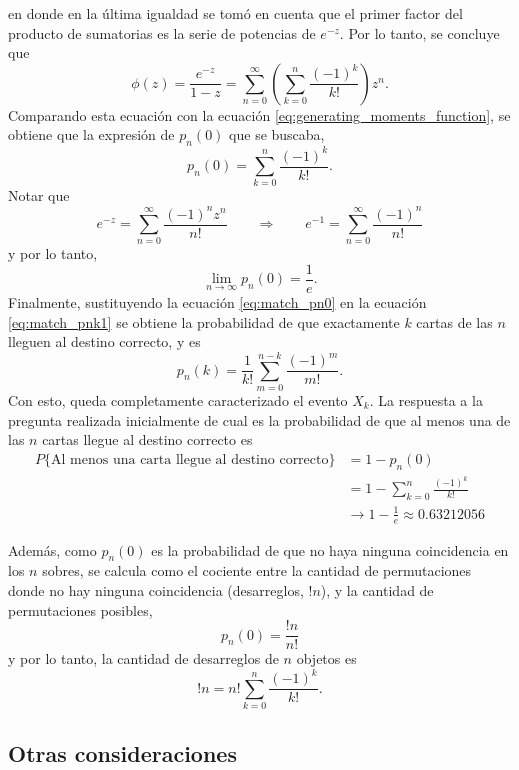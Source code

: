 \documentclass[a4paper]{report}
\begin{document}
en donde en la última igualdad se tomó en cuenta que el primer factor del producto de sumatorias es la serie de potencias de \(e^{-z}\). Por lo tanto, se concluye que
\begin{equation*}
 \phi(z)=\frac{e^{-z}}{1-z}=\sum_{n=0}^{\infty}\left(\sum_{k=0}^{n}\frac{(-1)^k}{k!}\right)z^n.
\end{equation*}
Comparando esta ecuación con la ecuación \ref{eq:generating_moments_function}, se obtiene que la expresión de \(p_n(0)\) que se buscaba, 
\begin{equation}\label{eq:match_pn0}
 p_n(0)=\sum_{k=0}^{n}\frac{(-1)^k}{k!}.
\end{equation}
Notar que
\[
 e^{-z}=\sum_{n=0}^{\infty}\frac{(-1)^nz^n}{n!}\qquad\Rightarrow\qquad 
  e^{-1}=\sum_{n=0}^{\infty}\frac{(-1)^n}{n!}
\]
y por lo tanto,
\[
 \lim_{n\to\infty}p_n(0)=\frac{1}{e}.
\]
Finalmente, sustituyendo la ecuación \ref{eq:match_pn0} en la ecuación \ref{eq:match_pnk1} se obtiene la probabilidad de que exactamente \(k\) cartas de las \(n\) lleguen al destino correcto, y es
\[
 p_n(k)=\frac{1}{k!}\sum_{m=0}^{n-k}\frac{(-1)^m}{m!}.
\]
Con esto, queda completamente caracterizado el evento \(X_k\). La respuesta a la pregunta realizada inicialmente de cual es la probabilidad de que al menos una de las \(n\) cartas llegue al destino correcto es
\begin{align*}
 P\{\textrm{Al menos una carta llegue al destino correcto}\}&=1-p_n(0)\\
   &=1-\sum_{k=0}^{n}\frac{(-1)^k}{k!}\\
   &\to1-\frac{1}{e}\approx 0.63212056
\end{align*}

Además, como \(p_n(0)\) es la probabilidad de que no haya ninguna coincidencia en los \(n\) sobres, se calcula como el cociente entre la cantidad de permutaciones donde no hay ninguna coincidencia (desarreglos, \(!n\)), y la cantidad de permutaciones posibles,
\[
 p_n(0)=\frac{!n}{n!}
\]
y por lo tanto, la cantidad de desarreglos de \(n\) objetos es
\begin{equation}\label{eq:match_derangements}
 !n=n!\sum_{k=0}^{n}\frac{(-1)^k}{k!}.
\end{equation}


\subsection{Otras consideraciones}
\end{document}
